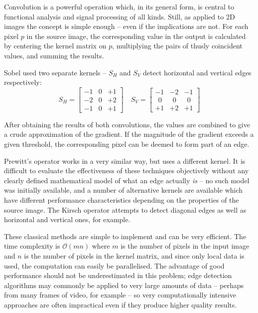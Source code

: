 \documentclass{acm_proc_article-sp}
\begin{document}
Convolution is a powerful operation which, in its general form, is central to
functional analysis and signal processing of all kinds. Still, as applied to 2D
images the concept is simple enough -- even if the implications are not. For each
pixel $p$ in the source image, the corresponding value in the output is
calculated by centering the kernel matrix on $p$, multiplying the pairs of
thusly coincident values, and summing the results.

Sobel used two separate kernels -- $S_H$ and $S_V$ detect horizontal and vertical edges respectively:
\begin{displaymath}
S_H = \begin{bmatrix} 
-1 & 0 & +1 \\
-2 & 0 & +2 \\
-1 & 0 & +1 
\end{bmatrix}
\quad
S_V = \begin{bmatrix} 
-1 & -2 & -1  \\
\ \ 0 & \ \ 0 & \ \ 0 \\
+1 & +2 & +1 
\end{bmatrix}
\end{displaymath}

After obtaining the results of both convolutions, the values are combined to
give a crude approximation of the gradient. If the magnitude of the gradient
exceeds a given threshold, the corresponding pixel can be deemed to form part
of an edge.

Prewitt's operator\cite{prewitt1970object} works in a very similar way, but
uses a different kernel. It is difficult to evaluate the effectiveness of these
techniques objectively without any clearly defined mathematical model of what
an edge actually \emph{is} -- no such model was initially available, and a
number of alternative kernels are available which have different performance
characteristics depending on the properties of the source image. The Kirsch
operator attempts to detect diagonal edges as well as horizontal and vertical
ones, for example.


These classical methods are simple to implement and can be very efficient.  The
time complexity is $\mathcal{O}(mn)$ where $m$ is the number of pixels in the
input image and $n$ is the number of pixels in the kernel matrix, and since
only local data is used, the computation can easily be parallelised. The
advantage of good performance should not be underestimated in this problem;
edge detection algorithms may commonly be applied to very large amounts of data
-- perhaps from many frames of video, for example -- so very computationally
intensive approaches are often impractical even if they produce higher quality 
results.
\end{document}
